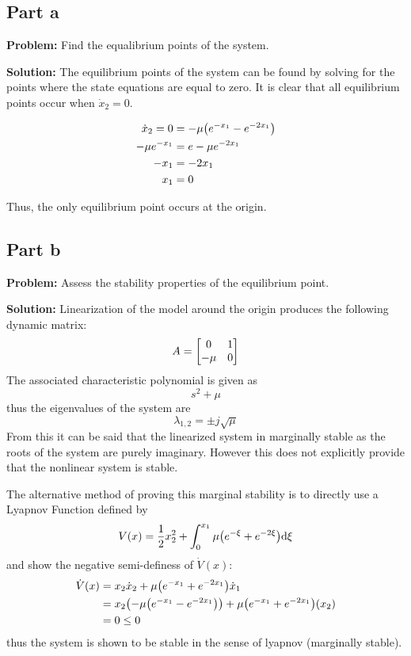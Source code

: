 \documentclass[letter]{article}
\begin{document}
\subsection{Part a}
\textbf{Problem:}
Find the equalibrium points of the system.

\noindent
\textbf{Solution:}
The equilibrium points of the system can be found by solving for the points where the state equations are equal to zero.
It is clear that all equilibrium points occur when $\dot{x}_2 = 0$.

\begin{align}
	\dot{x}_2 = 0 &= - \mu \qty(e^{-x_1} - e^{-2x_1})\\
	-\mu e^{-x_1} &= e -\mu e^{-2x_1}\\
	-x_1 &= -2x_1\\
	x_1 &= 0
\end{align}

Thus, the only equilibrium point occurs at the origin.

\subsection{Part b}
\textbf{Problem:}
Assess the stability properties of the equilibrium point.

\noindent
\textbf{Solution:}
Linearization of the model around the origin produces the following dynamic matrix:
\begin{equation}
	A = \mqty[	0 & 1\\
				-\mu & 0]
\end{equation}
The associated characteristic polynomial is given as $$s^2 + \mu$$ thus the eigenvalues of the system are $$\lambda_{1,2} = \pm j \sqrt{\mu}$$
From this it can be said that the linearized system in marginally stable as the roots of the system are purely imaginary. However this does not explicitly provide that the nonlinear system is stable.

The alternative method of proving this marginal stability is to directly use a Lyapnov Function defined by
\begin{equation}
	V(x) = \frac{1}{2} x_2^2 + \int_0^{x_1} \mu \qty(e^{-\xi} + e^{-2\xi}) \dd \xi
\end{equation}
and show the negative semi-definess of $\dot{V}(x)$:
\begin{align}
	\dot{V}(x) &= x_2 \dot{x}_2 + \mu \qty(e^{-x_1} + e^{-2x_1}) \dot{x}_1\\
	&= x_2 \qty(- \mu \qty(e^{-x_1} - e^{-2x_1})) + \mu \qty(e^{-x_1} + e^{-2x_1}) \qty(x_2)\\
	&= 0 \leq 0
\end{align}
thus the system is shown to be stable in the sense of lyapnov (marginally stable).
\end{document}
